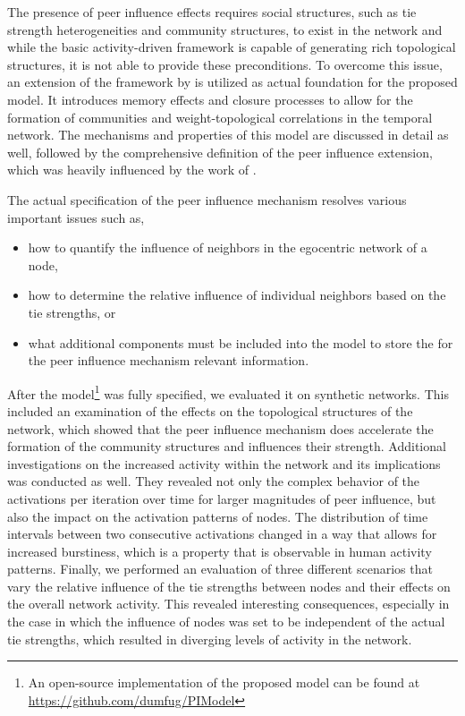 The presence of peer influence effects requires social structures, such as tie strength heterogeneities and community structures, to exist in the network and while the basic activity-driven framework is capable of generating rich topological structures, it is not able to provide these preconditions.
To overcome this issue, an extension of the framework by \citet{Laurent2015} is utilized as actual foundation for the proposed model.
It introduces memory effects and closure processes to allow for the formation of communities and weight-topological correlations in the temporal network.
The mechanisms and properties of this model are discussed in detail as well, followed by the comprehensive definition of the peer influence extension, which was heavily influenced by the work of \citet{Walk2016}.

The actual specification of the peer influence mechanism resolves various important issues such as,

\begin{itemize}[\itemsep=\parsep]
    \item how to quantify the influence of neighbors in the egocentric network of a node,
    \item how to determine the relative influence of individual neighbors based on the tie strengths, or
    \item what additional components must be included into the model to store the for the peer influence mechanism relevant information.
\end{itemize}

After the model\footnote{An open-source implementation of the proposed model can be found at \url{https://github.com/dumfug/PIModel}} was fully specified, we evaluated it on synthetic networks.
This included an examination of the effects on the topological structures of the network, which showed that the peer influence mechanism does accelerate the formation of the community structures and influences their strength.
Additional investigations on the increased activity within the network and its implications was conducted as well.
They revealed not only the complex behavior of the activations per iteration over time for larger magnitudes of peer influence, but also the impact on the activation patterns of nodes.
The distribution of time intervals between two consecutive activations changed in a way that allows for increased burstiness, which is a property that is observable in human activity patterns.
Finally, we performed an evaluation of three different scenarios that vary the relative influence of the tie strengths between nodes and their effects on the overall network activity.
This revealed interesting consequences, especially in the case in which the influence of nodes was set to be independent of the actual tie strengths, which resulted in diverging levels of activity in the network.


